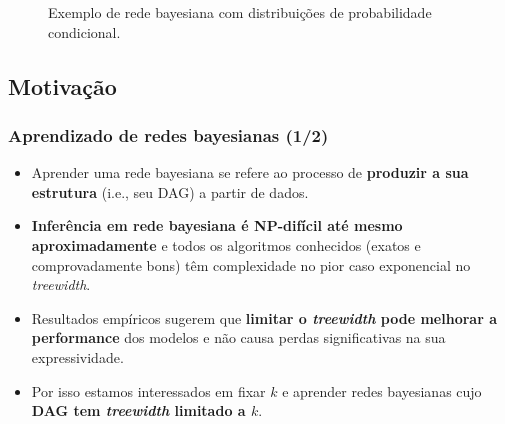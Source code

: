 \documentclass{beamer}
\begin{document}
\begin{frame}
\begin{figure}
{
      }

      \caption{Exemplo de rede bayesiana com distribuições de probabilidade condicional.}
      \label{fig:bayes}
    \end{figure}
  \end{frame}

  \subsection{Motivação}

  \begin{frame}
    \frametitle{Aprendizado de redes bayesianas (1/2)}

    \begin{itemize}
      \item Aprender uma rede bayesiana se refere ao processo de \textbf{produzir a sua estrutura} (i.e., seu DAG) a partir de dados.
      \item \textbf{Inferência em rede bayesiana é NP-difícil até mesmo aproximadamente} e todos os algoritmos conhecidos (exatos e comprovadamente bons) têm complexidade no pior caso exponencial no \emph{treewidth}.
      \item Resultados empíricos sugerem que \textbf{limitar o \emph{treewidth} pode melhorar a performance} dos modelos e não causa perdas significativas na sua expressividade.
      \item Por isso estamos interessados em fixar $k$ e aprender redes bayesianas cujo \textbf{DAG tem \emph{treewidth} limitado a $k$}.
    \end{itemize}
  \end{frame}
\end{document}
